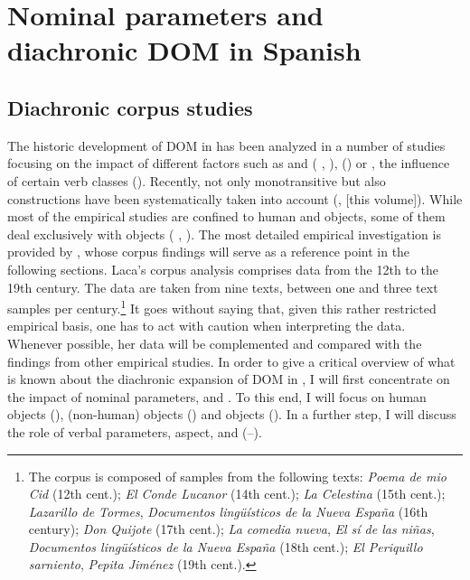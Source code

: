 \documentclass[output=paper]{LSP/langsci}
\begin{document}
\section{Nominal parameters and diachronic DOM in Spanish}\label{08-ga-sec:3}

\subsection{Diachronic corpus studies}\label{08-ga-sec:3.1}

The historic development of DOM in  has been analyzed in a number of studies focusing on the impact of different factors such as  and  (\cf \eg \citeauthor{Company2002Grammaticalization} \citeyear*{Company2002Grammaticalization}, \citealt{Laca2002Gramaticalizacion,Aissen2003Differential}),  (\cf \citealt{Melis1995Objetodirecto}) or , \ie the influence of certain verb classes (\cf \citealt{vonHeusinger2008Verbal,vonHeusingeretal2011Affectedness}). Recently, not only monotransitive but also  constructions have been systematically taken into account (\cf \citealt{Ortiz2005Objetos,Ortiz2011Construcciones}, \citealt{vonHeusinger2017Diachronic} [this volume]). 
While most of the empirical studies are confined to human and  objects, some of them deal exclusively with  objects (\cf \citeauthor{Company2002Avance} \citeyear*{Company2002Avance}, \citealt{Barraza2003Evolucion,Barraza2008Marcacion}). The most detailed empirical investigation is provided by \citet{Laca2006Objeto}, whose corpus findings will serve as a reference point in the following sections. Laca’s corpus analysis comprises data from the 12th to the 19th century. The data are taken from nine texts, \ie between one and three text samples per century.\footnote{The corpus is composed of samples from the following texts: \textit{Poema de mio Cid} (12th cent.); \textit{El Conde Lucanor} (14th cent.); \textit{La Celestina} (15th cent.); \textit{Lazarillo de Tormes}, \textit{Documentos lingüísticos de la Nueva España} (16th century); \textit{Don Quijote} (17th cent.); \textit{La comedia nueva}, \textit{El sí de las niñas}, \textit{Documentos lingüísticos de la Nueva España} (18th cent.); \textit{El Periquillo sarniento}, \textit{Pepita Jiménez} (19th cent.).} It goes without saying that, given this rather restricted empirical basis, one has to act with caution when interpreting the data. Whenever possible, her data will be complemented and compared with the findings from other empirical studies. In order to give a critical overview of what is known about the diachronic expansion of DOM in , I will first concentrate on the impact of nominal parameters, \ie {} and . To this end, I will focus on human objects (),  (non-human) objects () and  objects (). In a further step, I will discuss the role of verbal parameters, \ie aspect,  and  (--).
\end{document}
